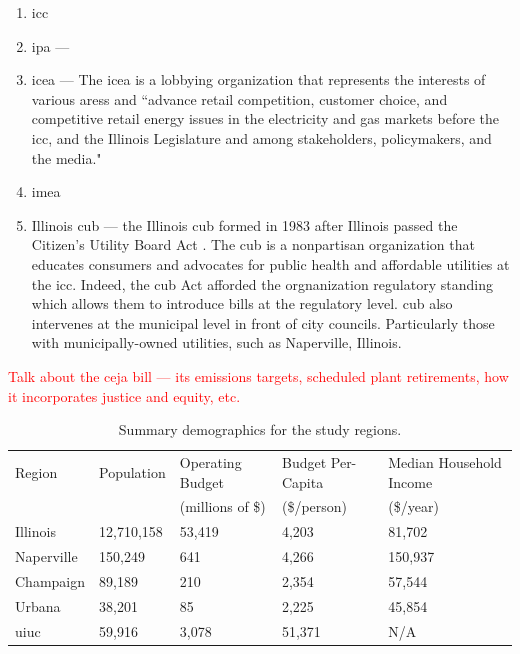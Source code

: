 \begin{enumerate}
    \item \acf{icc}
    \item \acf{ipa} --- 
    \item \acf{icea} --- The \ac{icea} is a lobbying organization that
    represents the interests of various \acp{ares} and ``advance retail
    competition, customer choice, and competitive retail energy issues in the
    electricity and gas markets before the \ac{icc}, and the Illinois
    Legislature and among stakeholders, policymakers, and the media."
    \item \acf{imea}
    \item Illinois \acf{cub} --- the Illinois \ac{cub} formed in 1983 after
    Illinois passed the Citizen's Utility Board Act
    \cite{illinois_83rd_general_assembly_citizens_1983}. The \ac{cub} is a
    nonpartisan organization that educates consumers and advocates for public
    health and affordable utilities at the \ac{icc}. Indeed, the \ac{cub} Act
    afforded the orgnanization regulatory standing which allows them to
    introduce bills at the regulatory level. \ac{cub} also intervenes at the
    municipal level in front of city councils. Particularly those with
    municipally-owned utilities, such as Naperville, Illinois.
\end{enumerate}

\textcolor{red}{Talk about the \ac{ceja} bill --- its emissions targets, scheduled plant retirements,
how it incorporates justice and equity, etc.}

\begin{table}[htbp!]
    \centering
    \caption{Summary demographics for the study regions.}
    \label{tab:demographics}
    \begin{tabular}{lllll}
        \toprule
        Region & Population & Operating Budget & Budget Per-Capita & Median
        Household Income \\
        & & (millions of \$) & (\$/person) &(\$/year) \\
        \midrule
        Illinois
        \cite{united_states_census_bureau_quickfacts_2024-3,sturm_illinois_2024}&
        12,710,158  & 53,419 & 4,203 & 81,702\\
        Naperville
        \cite{united_states_census_bureau_quickfacts_2024-2,munch_annual_2024} &
        150,249  & 641 & 4,266 & 150,937 \\
        Champaign
        \cite{united_states_census_bureau_quickfacts_2024,nees_adopted_2024} &
        89,189 & 210 & 2,354 & 57,544 \\
        Urbana \cite{united_states_census_bureau_quickfacts_2024-1,
        ho_city_2024}& 38,201 & 85 & 2,225 & 45,854 \\
        \ac{uiuc} \cite{data_usa_university_2022,
        university_of_illinois_system_fy_2024} & 59,916 & 3,078 & 51,371 & N/A
        \\
        \bottomrule
    \end{tabular}
\end{table}

